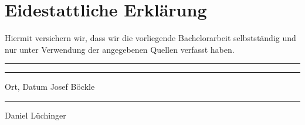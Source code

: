 \section{Eidestattliche Erklärung}

Hiermit versichern wir, dass wir die vorliegende Bachelorarbeit selbstständig und nur unter Verwendung der angegebenen Quellen verfasst haben.


\vspace{80pt}

\noindent\rule{5cm}{.4pt}\hfill\rule{5cm}{.4pt}\par
\noindent Ort, Datum \hfill Josef Böckle

\vspace{50pt}

\noindent \hfill \rule{5cm}{.4pt}\par
\noindent \hfill Daniel Lüchinger 

\newpage